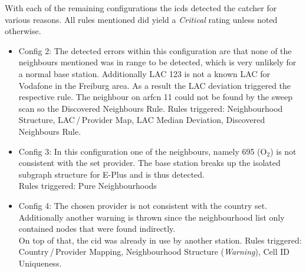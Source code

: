 With each of the remaining configurations the \gls{icds} detected the catcher for various reasons.
All rules mentioned did yield a \emph{Critical} rating unless noted otherwise.
\begin{itemize}
	\item Config 2: The detected errors within this configuration are that none of the neighbours mentioned was in range to be detected, which is very unlikely for a normal base station.
	Additionally LAC 123 is not a known LAC for Vodafone in the Freiburg area.
	As a result the LAC deviation triggered the respective rule.
	The neighbour on \gls{arfcn} 11 could not be found by the sweep scan so the Discovered Neighbours Rule.
	Rules triggered: Neighbourhood Structure, LAC\,/\,Provider Map, LAC Median Deviation, Discovered Neighbours Rule.
	\item Config 3: In this configuration one of the neighbours, namely 695 (O$_2$) is not consistent with the set provider.
	The base station breaks up the isolated subgraph structure for E-Plus and is thus detected.\\
	Rules triggered: Pure Neighbourhoods
	\item Config 4:	The chosen provider is not consistent with the country set.
	Additionally another warning is thrown since the neighbourhood list only contained nodes that were found indirectly.\\
	On top of that, the \gls{cid} was already in use by another station.
	Rules triggered: Country\,/\,Provider Mapping, Neighbourhood Structure (\emph{Warning}), Cell ID Uniqueness.
\end{itemize}

